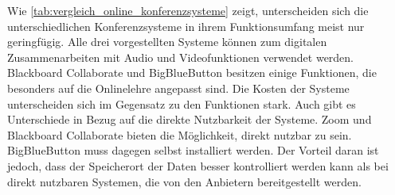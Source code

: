 Wie \autoref{tab:vergleich_online_konferenzsysteme} zeigt, unterscheiden sich die unterschiedlichen Konferenzsysteme in ihrem Funktionsumfang meist nur geringfügig.
Alle drei vorgestellten Systeme können zum digitalen Zusammenarbeiten mit Audio und Videofunktionen verwendet werden.
Blackboard Collaborate und BigBlueButton besitzen einige Funktionen, die besonders auf die Onlinelehre angepasst sind.
Die Kosten der Systeme unterscheiden sich im Gegensatz zu den Funktionen stark.
Auch gibt es Unterschiede in Bezug auf die direkte Nutzbarkeit der Systeme.
Zoom und Blackboard Collaborate bieten die Möglichkeit, direkt nutzbar zu sein.
BigBlueButton muss dagegen selbst installiert werden.
Der Vorteil daran ist jedoch, dass der Speicherort der Daten besser kontrolliert werden kann als bei direkt nutzbaren Systemen, die von den Anbietern bereitgestellt werden.